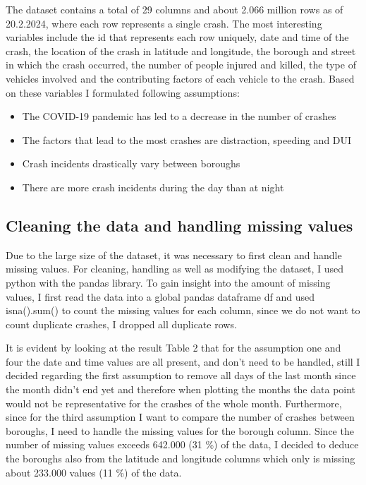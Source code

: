 \documentclass[runningheads]{llncs}
\begin{document}
The dataset contains a total of 29 columns and about 2.066 million rows as of 20.2.2024, where each row represents a single crash.
The most interesting variables include the id that represents each row uniquely, date and time of the crash, the location of the crash in latitude and longitude, 
the borough and street in which the crash occurred, the number of people injured and killed, the type of vehicles involved and the
contributing factors of each vehicle to the crash.
Based on these variables I formulated following assumptions:
\begin{itemize}
\item The COVID-19 pandemic has led to a decrease in the number of crashes
\item The factors that lead to the most crashes are distraction, speeding and DUI
\item Crash incidents drastically vary between boroughs
\item There are more crash incidents during the day than at night
\end{itemize}

\subsection{Cleaning the data and handling missing values}

Due to the large size of the dataset, it was necessary to first clean and handle missing values.
For cleaning, handling as well as modifying the dataset, I used python with the pandas library.
To gain insight into the amount of missing values, I first read the data into a global pandas dataframe df 
and used isna().sum() to count the missing values for each column, since we do not want to count 
duplicate crashes, I dropped all duplicate rows.

It is evident by looking at the result Table 2 that for the assumption one and four the date and time 
values are all present, and don't need to be handled, still I decided regarding the first assumption to
remove all days of the last month since the month didn't end yet and therefore when plotting the months the data point 
would not be representative for the crashes of the whole month. Furthermore, since for the third assumption 
I want to compare the number of crashes between boroughs, I need to handle the missing values for the borough column.
Since the number of missing values exceeds 642.000 (31 \%) of the data, I decided to deduce the boroughs also 
from the latitude and longitude columns which only is missing about 233.000 values (11 \%) of the data. 
\end{document}
